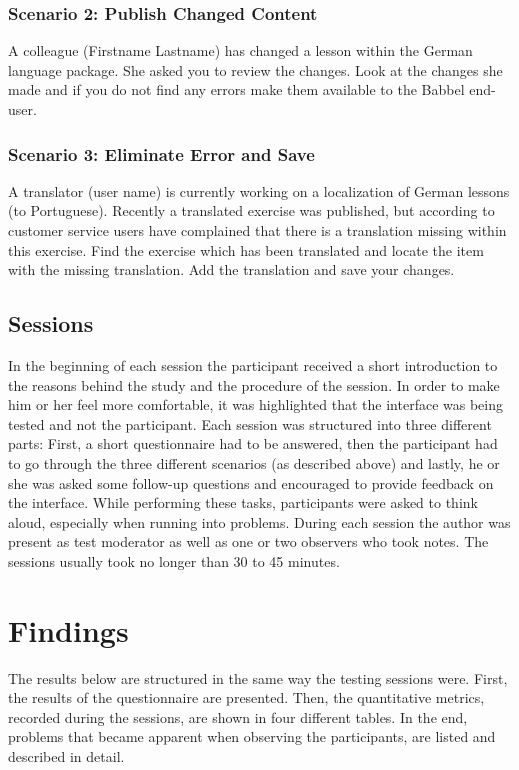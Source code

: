 \subsubsection{Scenario 2: Publish Changed Content}
A colleague (Firstname Lastname) has changed a lesson within the German language package. She asked you to review the changes. Look at the changes she made and if you do not find any errors make them available to the Babbel end-user.


\subsubsection{Scenario 3: Eliminate Error and Save}
A translator (user name) is currently working on a localization of German lessons (to Portuguese). Recently a translated exercise was published, but according to customer service users have complained that there is a translation missing within this exercise. Find the exercise which has been translated and locate the item with the missing translation. Add the translation and save your changes.

\subsection{Sessions}
In the beginning of each session the participant received a short introduction to the reasons behind the study and the procedure of the session. In order to make him or her feel more comfortable, it was highlighted that the interface was being tested and not the participant. Each session was structured into three different parts: First, a short questionnaire had to be answered, then the participant had to go through the three different scenarios (as described above) and lastly, he or she was asked some follow-up questions and encouraged to provide feedback on the interface. While performing these tasks, participants were asked to think aloud, especially when running into problems. During each session the author was present as test moderator as well as one or two observers who took notes. The sessions usually took no longer than 30 to 45 minutes.

\clearpage

\section{Findings}
The results below are structured in the same way the testing sessions were. First, the results of the questionnaire are presented. Then, the quantitative metrics, recorded during the sessions, are shown in four different tables. In the end, problems that became apparent when observing the participants, are listed and described in detail.

